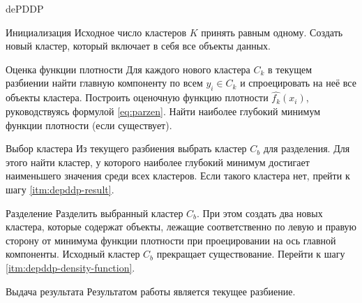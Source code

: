 \documentclass[12pt]{diploma}
\begin{document}
	\begin{algorithm}{dePDDP}{}
		\begin{astep}{Инициализация}
			Исходное число кластеров $ K $ принять равным одному. Создать новый кластер, который включает в себя все объекты данных.
		\end{astep}
		\begin{astep}{Оценка функции плотности} \label{itm:depddp-density-function}
			Для каждого нового кластера $ C_k $ в текущем разбиении найти главную компоненту по всем $ y_i \in C_k $ и спроецировать на неё все объекты кластера. Построить оценочную функцию плотности $ \hat{f_k}(x_i) $, руководствуясь формулой \eqref{eq:parzen}. Найти наиболее глубокий минимум функции плотности (если существует).
		\end{astep}
		\begin{astep}{Выбор кластера}
			Из текущего разбиения выбрать кластер $ C_{b}$ для разделения. Для этого найти кластер, у которого наиболее глубокий минимум достигает наименьшего значения среди всех кластеров. Если такого кластера нет, прейти к шагу \ref{itm:depddp-result}.
		\end{astep}
		\begin{astep}{Разделение}
			Разделить выбранный кластер $ C_{b} $. При этом создать два новых кластера, которые содержат объекты, лежащие соответственно по левую и правую сторону от минимума функции плотности при проецировании на ось главной компоненты. Исходный кластер $ C_{b} $ прекращает существование. Перейти к шагу \ref{itm:depddp-density-function}.
		\end{astep}
		\begin{astep}{Выдача результата} \label{itm:depddp-result}
			Результатом работы \dePDDP является текущее разбиение.
		\end{astep}
				
		
				
	\end{algorithm}
	
\end{document}
